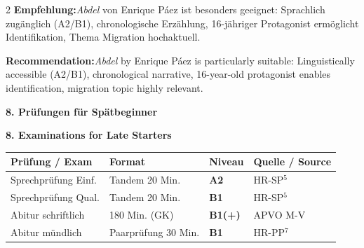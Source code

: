\documentclass[10pt,a4paper]{article}
\newcommand{\secbil}[2]{%
\vspace{6pt}
\noindent\colorbox{spaet}{\parbox{0.48\textwidth}{\color{white}\bfseries\small #1}}%
\hfill%
\colorbox{english}{\parbox{0.48\textwidth}{\color{white}\bfseries\small #2}}
\vspace{3pt}
}
\begin{document}
\begin{paracol}{2}
\small
\textbf{Empfehlung:}\footnotemark[8] \textit{Abdel} von Enrique Páez ist besonders geeignet: Sprachlich zugänglich (A2/B1), chronologische Erzählung, 16-jähriger Protagonist ermöglicht Identifikation, Thema Migration hochaktuell.

\switchcolumn

\small\color{english}
\textbf{Recommendation:}\footnotemark[8] \textit{Abdel} by Enrique Páez is particularly suitable: Linguistically accessible (A2/B1), chronological narrative, 16-year-old protagonist enables identification, migration topic highly relevant.

\end{paracol}


\secbil{8. Prüfungen für Spätbeginner}{8. Examinations for Late Starters}

\vspace{2mm}

\begin{center}
\small
\begin{tabular}{|l|l|l|l|}
\hline
\rowcolor{lightgray}
\textbf{Prüfung / Exam} & \textbf{Format} & \textbf{Niveau} & \textbf{Quelle / Source} \\
\hline
Sprechprüfung Einf. & Tandem 20 Min. & \textcolor{spaet}{\textbf{A2}} & HR-SP$^5$ \\
\hline
Sprechprüfung Qual. & Tandem 20 Min. & \textcolor{spaet}{\textbf{B1}} & HR-SP$^5$ \\
\hline
Abitur schriftlich & 180 Min. (GK) & \textcolor{spaet}{\textbf{B1(+)}} & APVO M-V \\
\hline
Abitur mündlich & Paarprüfung 30 Min. & \textcolor{spaet}{\textbf{B1}} & HR-PP$^7$ \\
\hline
\end{tabular}
\end{center}

\vspace{2mm}
\end{document}
